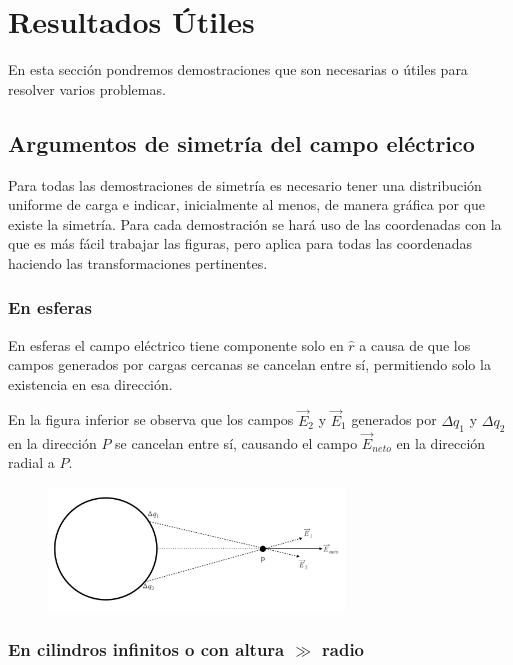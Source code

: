 \section{Resultados Útiles}

En esta sección pondremos demostraciones que son necesarias o útiles para resolver varios problemas.

\subsection{Argumentos de simetría del campo eléctrico}

Para todas las demostraciones de simetría es necesario tener una distribución uniforme de carga e indicar, inicialmente al menos, de manera gráfica por que existe la simetría. Para cada demostración se hará uso de las coordenadas con la que es más fácil trabajar las figuras, pero aplica para todas las coordenadas haciendo las transformaciones pertinentes.

\subsubsection{En esferas}

\label{SimetríaEsfera}
En esferas el campo eléctrico tiene componente solo en $\hat{r}$ a causa de que los campos generados por cargas cercanas se cancelan entre sí, permitiendo solo la existencia en esa dirección. 

En la figura inferior se observa que los campos $\Vec{E}_2$ y $\Vec{E}_1$ generados por $\Delta q_1$ y $\Delta q_2$ en la dirección $P$ se cancelan entre sí, causando el campo $\Vec{E}_{neto}$ en la dirección radial a $P$.
\begin{figure}[H]
    \centering
    \includegraphics[width=0.7\textwidth]{Resultados_utiles/demost_simetria_esfera.png}
    \label{fig:simetria_esfera}
\end{figure}

\subsubsection{En cilindros infinitos o con altura $\gg$ radio}

